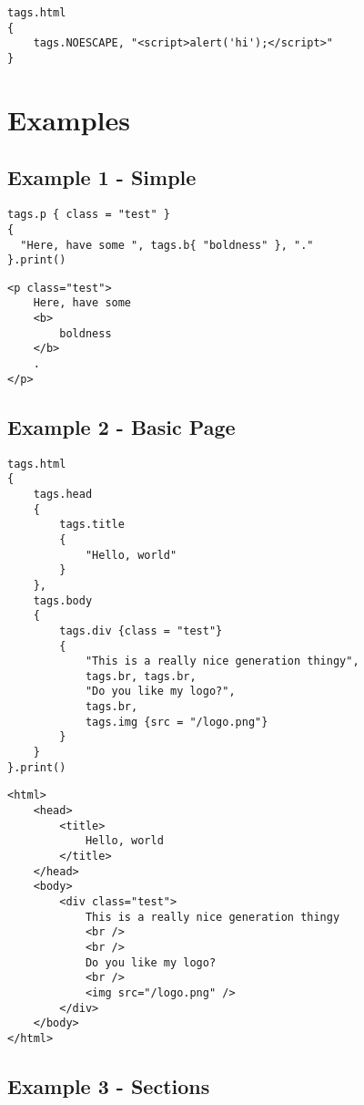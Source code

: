 \documentclass[a4paper,11pt]{report}
\newcommand{\setlua}{\lstset{language=Lua}}
\newcommand{\sethtml}{\lstset{language=HTML}}
\begin{document}
\begin{lstlisting}
tags.html
{
    tags.NOESCAPE, "<script>alert('hi');</script>"
}
\end{lstlisting}

\section{Examples}

\subsection{Example 1 - Simple}

\setlua
\begin{lstlisting}
tags.p { class = "test" }
{
  "Here, have some ", tags.b{ "boldness" }, "."
}.print()
\end{lstlisting}

\sethtml
\begin{lstlisting}
<p class="test">
    Here, have some 
    <b>
        boldness
    </b>
    .
</p>
\end{lstlisting}

\subsection{Example 2 - Basic Page}
\setlua
\begin{lstlisting}
tags.html
{
    tags.head
    {
        tags.title
        {
            "Hello, world"
        }
    },
    tags.body
    {
        tags.div {class = "test"}
        {
            "This is a really nice generation thingy",
            tags.br, tags.br,
            "Do you like my logo?",
            tags.br,
            tags.img {src = "/logo.png"}
        }
    }
}.print()
\end{lstlisting}

\sethtml
\begin{lstlisting}
<html>
    <head>
        <title>
            Hello, world
        </title>
    </head>
    <body>
        <div class="test">
            This is a really nice generation thingy
            <br />
            <br />
            Do you like my logo?
            <br />
            <img src="/logo.png" />
        </div>
    </body>
</html>
\end{lstlisting}

\subsection{Example 3 - Sections}
\end{document}
